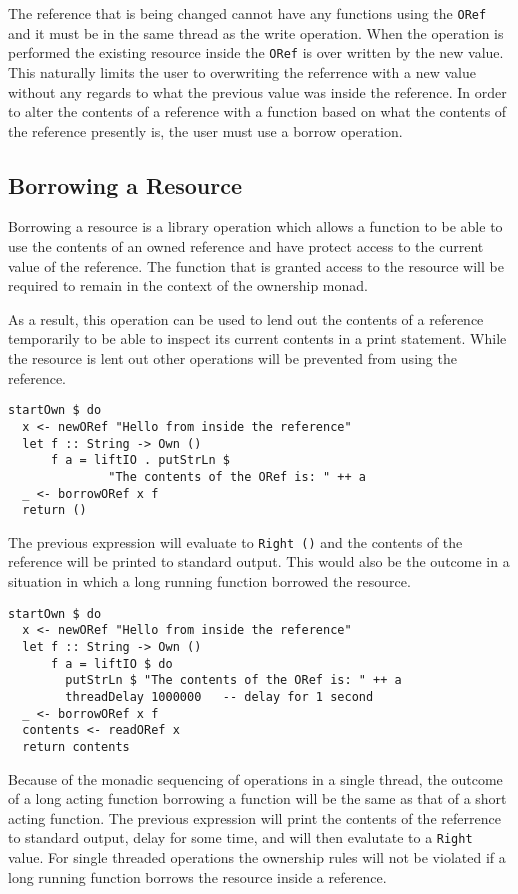 \documentclass[onehalf,11pt]{beavtex}
\begin{document}
The reference that is being changed cannot have any functions using the
\texttt{ORef} and it must be in the same thread as the write operation.
When the operation is performed the existing resource inside the \texttt{ORef}
is over written by the new value.
This naturally limits the user to overwriting the referrence with a new value
without any regards to what the previous value was inside the reference.
In order to alter the contents of a reference with a function based on what
the contents of the reference presently is, the user must use a
borrow operation.

\subsection{Borrowing a Resource}

Borrowing a resource is a library operation which allows a function to be able
to use the contents of an owned reference and have protect access to
the current value of the reference.
The function that is granted access to the resource will be required to remain
in the context of the ownership monad.

As a result, this operation can be used to lend out the contents of a reference
temporarily to be able to inspect its current contents in a print statement.
While the resource is lent out other operations will be prevented from using the
reference.

\begin{lstlisting}
startOwn $ do
  x <- newORef "Hello from inside the reference"
  let f :: String -> Own ()
      f a = liftIO . putStrLn $
              "The contents of the ORef is: " ++ a
  _ <- borrowORef x f
  return ()
\end{lstlisting}

The previous expression will evaluate to \texttt{Right ()} and the contents
of the reference will be printed to standard output.
This would also be the outcome in a situation in which a long running function
borrowed the resource.

\begin{lstlisting}
startOwn $ do
  x <- newORef "Hello from inside the reference"
  let f :: String -> Own ()
      f a = liftIO $ do
        putStrLn $ "The contents of the ORef is: " ++ a
        threadDelay 1000000   -- delay for 1 second
  _ <- borrowORef x f
  contents <- readORef x
  return contents
\end{lstlisting}

Because of the monadic sequencing of operations in a single thread,
the outcome of a long acting function borrowing a function will be the same
as that of a short acting function.
The previous expression will print the contents of the referrence to
standard output, delay for some time, and will then evalutate to
a \texttt{Right} value.
For single threaded operations the ownership rules will not be violated if
a long running function borrows the resource inside a reference.
\end{document}
